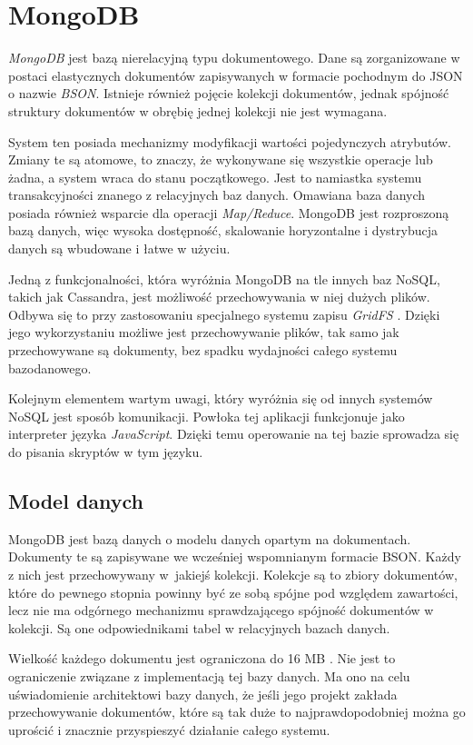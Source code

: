\section{MongoDB}

\textit{MongoDB} jest bazą nierelacyjną typu dokumentowego.
Dane są zorganizowane w postaci elastycznych dokumentów zapisywanych w formacie pochodnym do JSON o nazwie \textit{BSON}.
Istnieje również pojęcie kolekcji dokumentów, jednak spójność struktury dokumentów w obrębię jednej kolekcji nie jest wymagana.

System ten posiada mechanizmy modyfikacji wartości pojedynczych atrybutów.
Zmiany te są atomowe, to znaczy, że wykonywane się wszystkie operacje lub żadna, a system wraca do stanu początkowego.
Jest to namiastka systemu transakcyjności znanego z relacyjnych baz danych.
Omawiana baza danych posiada również wsparcie dla operacji \textit{Map/Reduce}. 
MongoDB jest rozproszoną bazą danych, więc wysoka dostępność, skalowanie horyzontalne i dystrybucja danych są wbudowane i łatwe w użyciu.

Jedną z funkcjonalności, która wyróżnia MongoDB na tle innych baz NoSQL, takich jak Cassandra, jest możliwość przechowywania w niej dużych plików.
Odbywa się to przy zastosowaniu specjalnego systemu zapisu \textit{GridFS} \cite{GridFSManual}.
Dzięki jego wykorzystaniu możliwe jest przechowywanie plików, tak samo jak przechowywane są dokumenty, bez spadku wydajności całego systemu bazodanowego.

Kolejnym elementem wartym uwagi, który wyróżnia się od innych systemów NoSQL jest sposób komunikacji.
Powłoka tej aplikacji funkcjonuje jako interpreter języka \textit{JavaScript}.
Dzięki temu operowanie na tej bazie sprowadza się do pisania skryptów w tym języku.

\subsection{Model danych} \label{sec:MongoModelDanych}

MongoDB jest bazą danych o modelu danych opartym na dokumentach.
Dokumenty te są zapisywane we wcześniej wspomnianym formacie BSON.
Każdy z nich jest przechowywany w~jakiejś kolekcji.
Kolekcje są to zbiory dokumentów, które do pewnego stopnia powinny być ze sobą spójne pod względem zawartości, lecz nie ma odgórnego mechanizmu sprawdzającego spójność dokumentów w kolekcji.
Są one odpowiednikami tabel w relacyjnych bazach danych.

Wielkość każdego dokumentu jest ograniczona do 16 MB \cite{DocumentsManual}.
Nie jest to ograniczenie związane z implementacją tej bazy danych.
Ma ono na celu uświadomienie architektowi bazy danych, że jeśli jego projekt zakłada przechowywanie dokumentów, które są tak duże to najprawdopodobniej można go uprościć i znacznie przyspieszyć działanie całego systemu.

